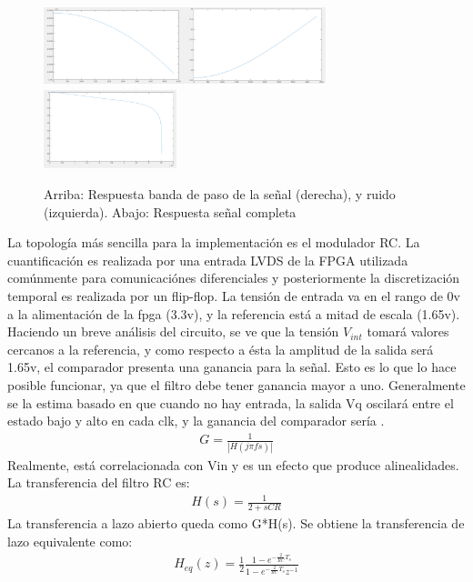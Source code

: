 \documentclass[a4paper,conference]{IEEEtran}
\begin{document}
\begin{figure}[!b]
\centering
\includegraphics[height=0.9in]{Respuesta_BP_Modulador_Combinada}
\centering
\includegraphics[height=0.9in]{Respuesta_Modulador_Completa}
\caption{Arriba: Respuesta banda de paso de la se\~nal (derecha), y ruido (izquierda). Abajo: Respuesta se\~nal completa}
\label{fig_5}
\end{figure}
La topolog\'ia m\'as sencilla para la implementaci\'on es el modulador RC. La cuantificaci\'on es realizada por una entrada LVDS de la FPGA utilizada com\'unmente para comunicaci\'ones diferenciales y posteriormente la discretizaci\'on temporal es realizada por un flip-flop. La tensi\'on de entrada va en el rango de 0v a la alimentación de la fpga (3.3v), y la referencia está a mitad de escala (1.65v).  Haciendo un breve an\'alisis del circuito, se ve que la tensi\'on $V_{int}$ tomar\'a valores cercanos a la referencia, y como respecto a \'esta la amplitud de la salida ser\'a 1.65v, el comparador presenta una ganancia para la se\~nal. Esto es lo que lo hace posible funcionar, ya que el filtro debe tener ganancia mayor a uno. Generalmente se la estima basado en que cuando no hay entrada, la salida Vq oscilar\'a entre el estado bajo y alto en cada clk, y la ganancia del comparador ser\'ia .
\begin{align}
G=\frac{1}{|H(j\pi fs)|}
\end{align}
Realmente, está correlacionada con Vin y es un efecto que produce alinealidades. La transferencia del filtro RC es:
\begin{align}
H(s)=\frac{1}{2+sCR}
\end{align}
La transferencia a lazo abierto queda como G*H(s). 
Se obtiene la transferencia de lazo equivalente como:
\begin{align}
H_{eq}(z)=\frac{1}{2}\frac{1-e^{-\frac{2}{RC}T_s}}{1-e^{-\frac{2}{RC}T_s}z^{-1}}
\end{align}
\end{document}
